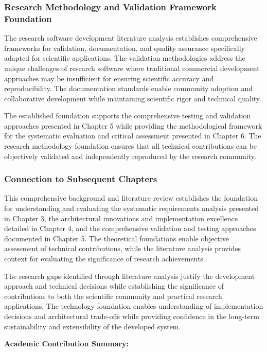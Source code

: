 \documentclass[11pt,a4paper]{article}
\begin{document}
\subsubsection{Research Methodology and Validation Framework Foundation}

The research software development literature analysis establishes comprehensive frameworks for validation,
documentation, and quality assurance specifically adapted for scientific applications. The validation methodologies
address the unique challenges of research software where traditional commercial development approaches may be
insufficient for ensuring scientific accuracy and reproducibility. The documentation standards enable community adoption
and collaborative development while maintaining scientific rigor and technical quality.

The established foundation supports the comprehensive testing and validation approaches presented in Chapter 5 while
providing the methodological framework for the systematic evaluation and critical assessment presented in Chapter 6. The
research methodology foundation ensures that all technical contributions can be objectively validated and independently
reproduced by the research community.

\subsubsection{Connection to Subsequent Chapters}

This comprehensive background and literature review establishes the foundation for understanding and evaluating the
systematic requirements analysis presented in Chapter 3, the architectural innovations and implementation excellence
detailed in Chapter 4, and the comprehensive validation and testing approaches documented in Chapter 5. The theoretical
foundations enable objective assessment of technical contributions, while the literature analysis provides context for
evaluating the significance of research achievements.

The research gaps identified through literature analysis justify the development approach and technical decisions while
establishing the significance of contributions to both the scientific community and practical research applications. The
technology foundation enables understanding of implementation decisions and architectural trade-offs while providing
confidence in the long-term sustainability and extensibility of the developed system.

\textbf{Academic Contribution Summary:}
\end{document}
